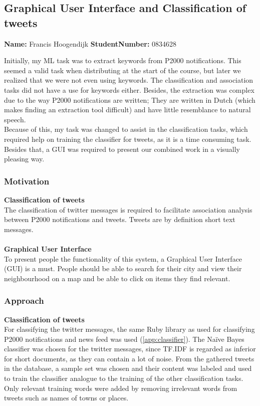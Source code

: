 \subsection{Graphical User Interface and Classification of tweets}
\textbf{Name:} Francis Hoogendijk  \indent \textbf{StudentNumber:} 0834628

Initially, my ML task was to extract keywords from P2000 notifications. This seemed a valid task when distributing at the start of the course, but later we realized that we were not even using keywords. The classification and association tasks did not have a use for keywords either. Besides, the extraction was complex due to the way P2000 notifications are written; They are written in Dutch (which makes finding an extraction tool difficult) and have little resemblance to natural speech. \\

Because of this, my task was changed to assist in the classification tasks, which required help on training the classifier for tweets, as it is a time consuming task. Besides that, a GUI was required to present our combined work in a visually pleasing way.

\subsubsection*{Motivation}
\textbf{Classification of tweets}\\
The classification of twitter messages is required to facilitate association analysis between P2000 notifications and tweets. Tweets are by definition short text messages.\\
\\
\textbf{Graphical User Interface}\\
To present people the functionality of this system, a Graphical User Interface (GUI) is a must. People should be able to search for their city and view their neighbourhood on a map and be able to click on items they find relevant. 
 
\subsubsection*{Approach}
\textbf{Classification of tweets}\\
For classifying the twitter messages, the same Ruby library as used for classifying P2000 notifications and news feed was used (\autoref{app:classifier}). The Na\"{i}ve Bayes classifier was chosen for the twitter messages, since TF.IDF is regarded as inferior for short documents, as they can contain a lot of noise. From the gathered tweets in the database, a sample set was chosen and their content was labeled and used to train the classifier analogue to the training of the other classification tasks. Only relevant training words were added by removing irrelevant words from tweets such as names of towns or places.\\


